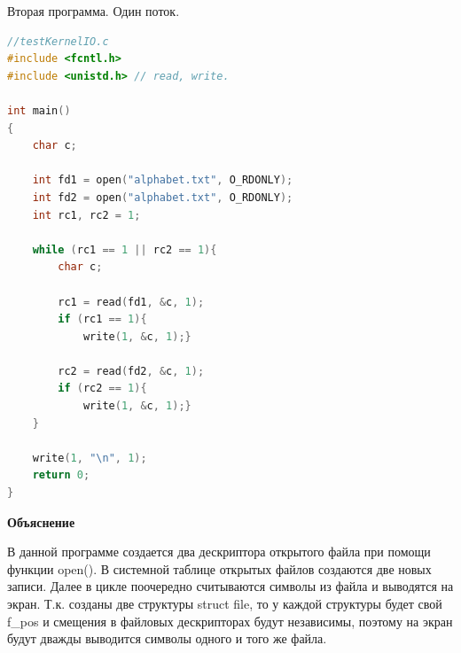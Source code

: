 \documentclass[a4paper,oneside,12pt]{extreport}
\begin{document}
\begin{task}
    Вторая программа. Один поток.
    \begin{lstlisting}[language=C]
//testKernelIO.c
#include <fcntl.h>
#include <unistd.h> // read, write.

int main()
{
	char c;
	
	int fd1 = open("alphabet.txt", O_RDONLY);
	int fd2 = open("alphabet.txt", O_RDONLY);
	int rc1, rc2 = 1;
	
	while (rc1 == 1 || rc2 == 1){
		char c;
		
		rc1 = read(fd1, &c, 1);
		if (rc1 == 1){
			write(1, &c, 1);}
		
		rc2 = read(fd2, &c, 1);
		if (rc2 == 1){
			write(1, &c, 1);}
	}
	
	write(1, "\n", 1);
	return 0;
}
    \end{lstlisting}

    
    
    \begin{figure}[ht!]
    \end{figure}
    
    \newpage
    \begin{center}
        \textbf{Объяснение}        
    \end{center}

    В данной программе создается два дескриптора открытого файла при помощи функции open(). 
    В системной таблице открытых файлов создаются две новых записи. %
    Далее в цикле поочередно считываются символы из файла и выводятся на экран.
    Т.к. созданы две структуры struct file, то у каждой структуры будет свой f\_pos и смещения в файловых дескрипторах будут независимы, поэтому на экран будут дважды выводится символы одного и того же файла.


\end{task}
\end{document}
